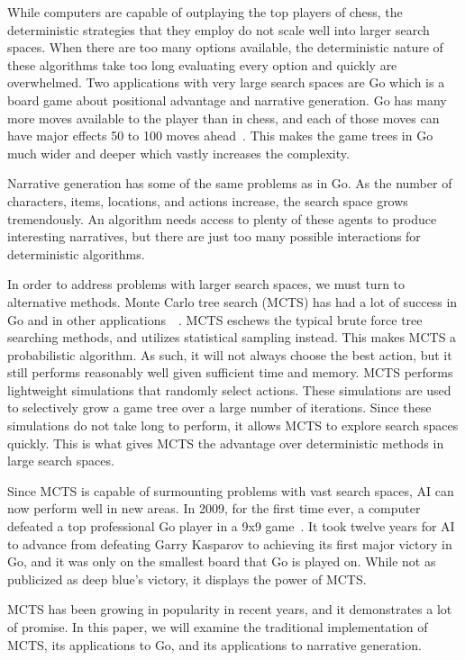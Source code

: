 \documentclass{sig-alternate}
\begin{document}
While computers are capable of outplaying the top players of chess, the deterministic strategies that they employ do not scale well into larger search spaces. When there are too many options available, the deterministic nature of these algorithms take too long evaluating every option and quickly are overwhelmed. Two applications with very large search spaces are Go which is a board game about positional advantage and narrative generation. Go has many more moves available to the player than in chess, and each of those moves can have major effects 50 to 100 moves ahead~\cite{RAVEinGo}. This makes the game trees in Go much wider and deeper which vastly increases the complexity. 

Narrative generation has some of the same problems as in Go. As the number of characters, items, locations, and actions increase, the search space grows tremendously. An algorithm needs access to plenty of these agents to produce interesting narratives, but there are just too many possible interactions for deterministic algorithms.

In order to address problems with larger search spaces, we must turn to alternative methods. Monte Carlo tree search (MCTS) has had a lot of success in Go and in other applications~\cite{TheGrandChallenge}~\cite{ActionSelection}. MCTS eschews the typical brute force tree searching methods, and utilizes statistical sampling instead. This makes MCTS a probabilistic algorithm. As such, it will not always choose the best action, but it still performs reasonably well given sufficient time and memory. MCTS performs lightweight simulations that randomly select actions. These simulations are used to selectively grow a game tree over a large number of iterations. Since these simulations do not take long to perform, it allows MCTS to explore search spaces quickly. This is what gives MCTS the advantage over deterministic methods in large search spaces.

Since MCTS is capable of surmounting problems with vast search spaces, AI can now perform well in new areas. In 2009, for the first time ever, a computer defeated a top professional Go player in a 9x9 game~\cite{TheGrandChallenge}. It took twelve years for AI to advance from defeating Garry Kasparov to achieving its first major victory in Go, and it was only on the smallest board that Go is played on. While not as publicized as deep blue's victory, it displays the power of MCTS.

MCTS has been growing in popularity in recent years, and it demonstrates a lot of promise. In this paper, we will examine the traditional implementation of MCTS, its applications to Go, and its applications to narrative generation.  
\end{document}
